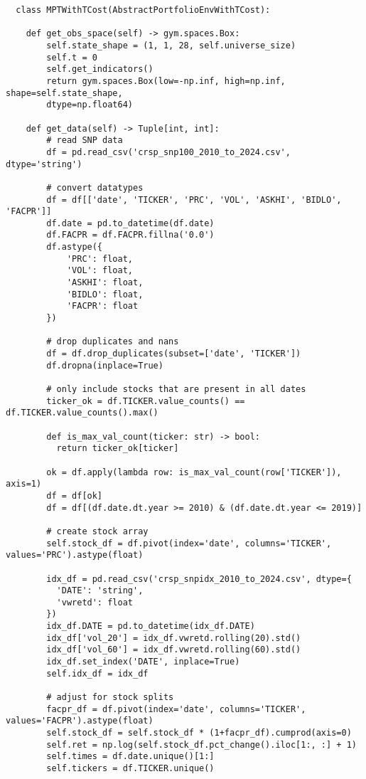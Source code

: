 \begin{verbatim}
  class MPTWithTCost(AbstractPortfolioEnvWithTCost):

    def get_obs_space(self) -> gym.spaces.Box:
        self.state_shape = (1, 1, 28, self.universe_size)
        self.t = 0
        self.get_indicators()
        return gym.spaces.Box(low=-np.inf, high=np.inf, shape=self.state_shape, 
        dtype=np.float64)
    
    def get_data(self) -> Tuple[int, int]:
        # read SNP data
        df = pd.read_csv('crsp_snp100_2010_to_2024.csv', dtype='string')
    
        # convert datatypes
        df = df[['date', 'TICKER', 'PRC', 'VOL', 'ASKHI', 'BIDLO', 'FACPR']]
        df.date = pd.to_datetime(df.date)
        df.FACPR = df.FACPR.fillna('0.0')
        df.astype({
            'PRC': float,
            'VOL': float,
            'ASKHI': float,
            'BIDLO': float,
            'FACPR': float
        })
    
        # drop duplicates and nans
        df = df.drop_duplicates(subset=['date', 'TICKER'])
        df.dropna(inplace=True)
    
        # only include stocks that are present in all dates
        ticker_ok = df.TICKER.value_counts() == df.TICKER.value_counts().max()

        def is_max_val_count(ticker: str) -> bool:
          return ticker_ok[ticker]
        
        ok = df.apply(lambda row: is_max_val_count(row['TICKER']), axis=1)
        df = df[ok]
        df = df[(df.date.dt.year >= 2010) & (df.date.dt.year <= 2019)]
    
        # create stock array
        self.stock_df = df.pivot(index='date', columns='TICKER', values='PRC').astype(float)
        
        idx_df = pd.read_csv('crsp_snpidx_2010_to_2024.csv', dtype={
          'DATE': 'string',
          'vwretd': float
        })
        idx_df.DATE = pd.to_datetime(idx_df.DATE)
        idx_df['vol_20'] = idx_df.vwretd.rolling(20).std()
        idx_df['vol_60'] = idx_df.vwretd.rolling(60).std()
        idx_df.set_index('DATE', inplace=True)
        self.idx_df = idx_df

        # adjust for stock splits
        facpr_df = df.pivot(index='date', columns='TICKER', values='FACPR').astype(float)
        self.stock_df = self.stock_df * (1+facpr_df).cumprod(axis=0)
        self.ret = np.log(self.stock_df.pct_change().iloc[1:, :] + 1)
        self.times = df.date.unique()[1:]
        self.tickers = df.TICKER.unique()


\end{verbatim}
